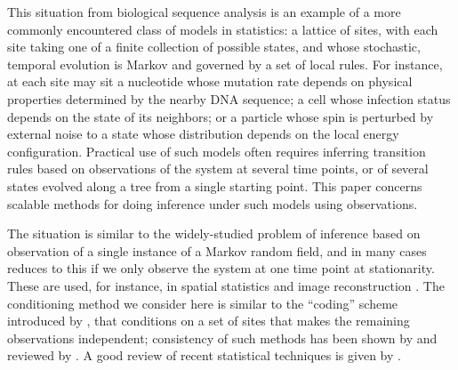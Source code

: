 \documentclass{article}
\theoremstyle{plain}
\theoremstyle{definition}
\begin{document}
This situation from biological sequence analysis
is an example of a more commonly encountered class of models in statistics:
a lattice of sites,
with each site taking one of a finite collection of possible states,
and whose stochastic, temporal evolution is Markov and governed by a set of local rules.
For instance, at each site may sit
a nucleotide whose mutation rate depends on physical properties determined by the nearby DNA sequence;
a cell whose infection status depends on the state of its neighbors;
or a particle whose spin is perturbed by external noise to a state whose distribution depends on the local energy configuration.
Practical use of such models often requires
inferring transition rules
based on observations of the system at several time points,
or of several states evolved along a tree from a single starting point.
This paper concerns scalable methods for doing inference under such models using observations.

The situation is similar to the widely-studied problem of inference based on observation
of a single instance of a Markov random field,
and in many cases reduces to this if we only observe the system at one time point at stationarity.
These are used, for instance, in spatial statistics \citep{besag1972nearestneighbour,gelfand2010handbook}
and image reconstruction \citep{geman1984stochastic,besag1986statistical}.
The conditioning method we consider here
is similar to the ``coding'' scheme introduced by \citet{besag1974spatial},
that conditions on a set of sites that makes the remaining observations independent;
consistency of such methods has been shown by \citet{comets1992consistency} and reviewed by \citet{larribe2011composite}.
A good review of recent statistical techniques is given by \citet{friel2012bayesian}.
\end{document}
